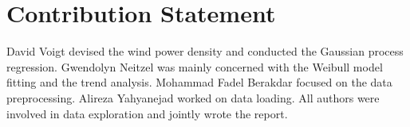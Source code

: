 \documentclass{article}
\theoremstyle{plain}
\theoremstyle{definition}
\theoremstyle{remark}
\begin{document}
\section*{Contribution Statement}
David Voigt devised the wind power density and conducted the Gaussian process regression. 
Gwendolyn Neitzel was mainly concerned with the Weibull model fitting and the trend analysis.
Mohammad Fadel Berakdar focused on the data preprocessing. Alireza Yahyanejad worked on data loading.
All authors were involved in data exploration and jointly wrote the report. 


\pagebreak



\end{document}
